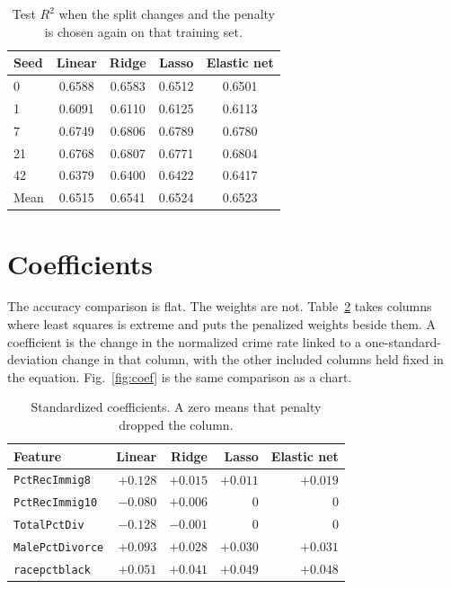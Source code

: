 \documentclass[conference]{IEEEtran}
\begin{document}
\begin{table}[t]
\caption{Test $R^{2}$ when the split changes and the penalty is chosen again on that training set.}
\label{tab:splits}
\centering
\scriptsize
\begin{tabular}{@{}lcccc@{}}
\toprule
Seed & Linear & Ridge & Lasso & Elastic net \\
\midrule
0  & 0.6588 & 0.6583 & 0.6512 & 0.6501 \\
1  & 0.6091 & 0.6110 & 0.6125 & 0.6113 \\
7  & 0.6749 & 0.6806 & 0.6789 & 0.6780 \\
21 & 0.6768 & 0.6807 & 0.6771 & 0.6804 \\
42 & 0.6379 & 0.6400 & 0.6422 & 0.6417 \\
\midrule
Mean & 0.6515 & 0.6541 & 0.6524 & 0.6523 \\
\bottomrule
\end{tabular}
\end{table}

\section{Coefficients}
The accuracy comparison is flat.
The weights are not.
Table~\ref{tab:coef} takes columns where least squares is extreme and puts the penalized weights beside them.
A coefficient is the change in the normalized crime rate linked to a one-standard-deviation change in that column, with the other included columns held fixed in the equation.
Fig.~\ref{fig:coef} is the same comparison as a chart.

\begin{table}[t]
\caption{Standardized coefficients. A zero means that penalty dropped the column.}
\label{tab:coef}
\centering
\scriptsize
\begin{tabular}{@{}lrrrr@{}}
\toprule
Feature & Linear & Ridge & Lasso & Elastic net \\
\midrule
\texttt{PctRecImmig8}   & $+0.128$ & $+0.015$ & $+0.011$ & $+0.019$ \\
\texttt{PctRecImmig10}  & $-0.080$ & $+0.006$ & $0$      & $0$ \\
\texttt{TotalPctDiv}    & $-0.128$ & $-0.001$ & $0$      & $0$ \\
\texttt{MalePctDivorce} & $+0.093$ & $+0.028$ & $+0.030$ & $+0.031$ \\
\texttt{racepctblack}   & $+0.051$ & $+0.041$ & $+0.049$ & $+0.048$ \\
\bottomrule
\end{tabular}
\end{table}
\end{document}
